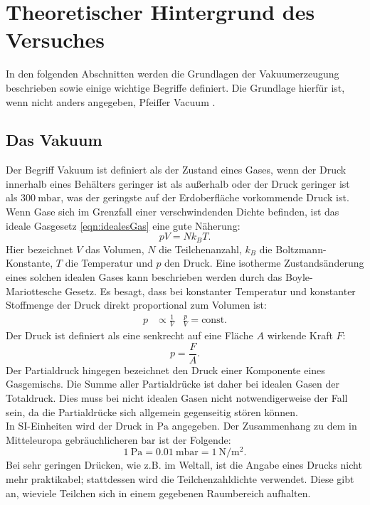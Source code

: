 \section{Theoretischer Hintergrund des Versuches}
\label{sec:Theorie}
In den folgenden Abschnitten werden die Grundlagen der Vakuumerzeugung beschrieben
sowie einige wichtige Begriffe definiert. Die Grundlage hierfür ist, wenn nicht anders
angegeben, Pfeiffer Vacuum \cite{pfeiffer}.

\subsection{Das Vakuum}
Der Begriff Vakuum ist definiert als der Zustand eines Gases, wenn der Druck
innerhalb eines Behälters geringer ist als außerhalb oder der Druck geringer
ist als $\SI{300}{\milli\bar}$, was der geringste auf der Erdoberfläche
vorkommende Druck ist.\\
Wenn Gase sich im Grenzfall einer verschwindenden Dichte befinden, ist das
ideale Gasgesetz \ref{eqn:idealesGas} eine gute Näherung:
\begin{equation}
 pV = N k_{B} T.
 \label{eqn:idealesGas}
\end{equation}
Hier bezeichnet $V$ das Volumen, $N$ die Teilchenanzahl, $k_{B}$ die
Boltzmann-Konstante, $T$ die Temperatur und $p$ den Druck.
Eine isotherme Zustandsänderung eines solchen idealen Gases kann beschrieben
werden durch das Boyle-Mariottesche Gesetz.
Es besagt, dass bei konstanter Temperatur und konstanter Stoffmenge der Druck direkt
proportional zum Volumen ist:
\begin{align}
  p & \propto \frac{1}{V} & \frac{p}{V} = \text{const}.
  \label{eqn:boylemariotte}
\end{align}
Der Druck ist definiert als eine senkrecht auf eine Fläche $A$ wirkende Kraft $F$:
\begin{equation}
  p = \frac{F}{A}.
  \label{eqn:druck}
\end{equation}
Der Partialdruck hingegen bezeichnet den Druck einer Komponente eines Gasgemischs.
Die Summe aller Partialdrücke ist daher bei idealen Gasen der Totaldruck. Dies
muss bei nicht idealen Gasen nicht notwendigerweise der Fall sein, da die Partialdrücke
sich allgemein gegenseitig stören können.\\
In SI-Einheiten wird der Druck in $\si{\pascal}$ angegeben. Der Zusammenhang zu dem
in Mitteleuropa gebräuchlicheren $\si{\bar}$ ist der Folgende:
\begin{equation}
 \SI{1}{\pascal} = \SI{0.01}{\milli\bar} = \SI{1}{\newton\per\square\meter}.
\end{equation}
Bei sehr geringen Drücken, wie z.B. im Weltall, ist die Angabe eines Drucks nicht
mehr praktikabel; stattdessen wird die Teilchenzahldichte verwendet. Diese gibt an,
wieviele Teilchen sich in einem gegebenen Raumbereich aufhalten.

